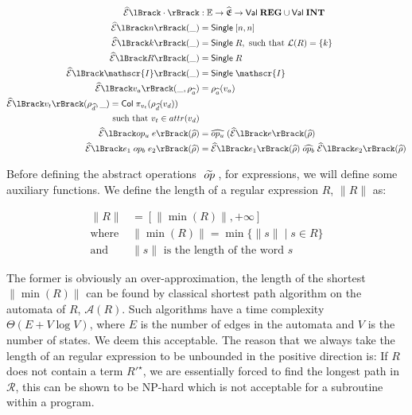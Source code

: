 \begin{align}
    \absexpsem{\cdot} &: \mathbb{E} \rightarrow \ab{\mathfrak{E}} \rightarrow \mathsf{Val} \; \mathbf{REG} \cup \mathsf{Val} \; \mathbf{INT}\\
    \absexpsem{n}(\_) &= \mathsf{Single} \; [n, n] \label{sem:exp1} \\
    \absexpsem{k}(\_) &= \mathsf{Single} \; R,  \text{ such that }\mathcal{L}(R) = \{ k \} \label{sem:exp2} \\
    \absexpsem{R}(\_) &= \mathsf{Single} \; R \\
    \absexpsem{\mathscr{I}}(\_) &= \mathsf{Single} \; \mathscr{I} \\
    \absexpsem{v_a}(\_, \rho_{\ab{a}}) &=  \rho_{\ab{a}}(v_a) \label{sem:exp3} \\
    \begin{split}
        \absexpsem{v_t}(\rho_{\ab{d}}, \_) &=  \mathsf{Col} \; \pi_{v_t}(\rho_{\ab{d}}(v_d)) \\
        &\text{ such that } v_t \in attr(v_d) \label{sem:exp4}
    \end{split} \\
    \absexpsem{op_u \; e}(\ab{\environment}) &= \ab{op_u} \; (\absexpsem{e}(\ab{\environment}) \label{eq:unary-op} \\
    \absexpsem{e_1 \;op_b\; e_2}(\ab{\environment}) &= \absexpsem{e_1}(\ab{\environment}) \;\ab{op_b}\; \absexpsem{e_2}(\ab{\environment}) \label{eq:binary-op}
\end{align}

Before defining the abstract operations $\;\widetilde{op}\;$, for expressions, we will define some auxiliary functions.
We define the length of a regular expression $R$, $\|R\|$ as:

\begin{align}\label{eq:r1}
    \|R\| & = [\|\min(R)\|, +\infty ] \\
    \text{where } & \|\min(R)\| = \min\{ \|s\| \mid s \in R \} \\ \label{eq:r2}
    \text{and } & \|s\| \text{ is the length of the word $s$}
\end{align}

The former is obviously an over-approximation, the length of the shortest $\|\min(R)\|$ can be found by classical shortest path algorithm on the automata of $R$, $\mathcal{A}(R)$.
Such algorithms have a time complexity $\Theta(E + V \log V)$, where $E$ is the number of edges in the automata and $V$ is the number of states.
We deem this acceptable.
The reason that we always take the length of an regular expression to be unbounded in the positive direction is: If $R$ does not contain a term $R'^\star$, we are essentially forced to find the longest path in $\mathcal{R}$, this can be shown to be NP-hard which is not acceptable for a subroutine within a program.

